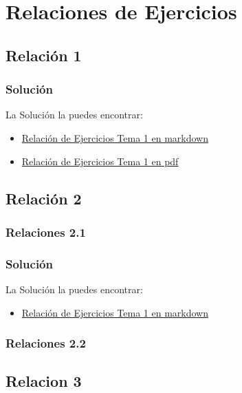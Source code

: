 \documentclass[a4paper,12pt]{article}
\begin{document}
\section{Relaciones de Ejercicios}
\subsection{Relación 1}

\subsubsection{Solución}
La Solución la puedes encontrar:
\begin{itemize}
    \item \href{https://github.com/ElblogdeIsmael/ElblogdeIsmael.github.io/tree/main/Asignaturas/Tercer%20A%C3%B1o/SCD/Teoria/Tema1/RelacionEjerciciosTema1.md}{Relación de Ejercicios Tema 1 en markdown}
    \item \href{https://github.com/ElblogdeIsmael/ElblogdeIsmael.github.io/tree/main/Asignaturas/Tercer%20A%C3%B1o/SCD/Teoria/Tema1/RelacionEjerciciosTema1.pdf}{Relación de Ejercicios Tema 1 en pdf}
\end{itemize}

\subsection{Relación 2}
\subsubsection{Relaciones 2.1}

\subsubsection{Solución}
La Solución la puedes encontrar:
\begin{itemize}
    \item \href{https://github.com/ElblogdeIsmael/ElblogdeIsmael.github.io/tree/main/Asignaturas/Tercer%20A%C3%B1o/SCD/Teoria/Tema2/RelacionEjerciciosTema2.md}{Relación de Ejercicios Tema 1 en markdown}
\end{itemize}

\subsubsection{Relaciones 2.2}


\subsection{Relacion 3}

\end{document}
